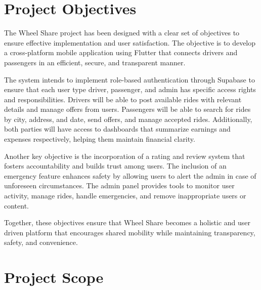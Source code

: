\section{Project Objectives}
The Wheel Share project has been designed with a clear set of objectives to ensure effective implementation and user satisfaction. The objective is to develop a cross-platform mobile application using Flutter that connects drivers and passengers in an efficient, secure, and transparent manner.

The system intends to implement role-based authentication through Supabase to ensure that each user type driver, passenger, and admin has specific access rights and responsibilities. Drivers will be able to post available rides with relevant details and manage offers from users. Passengers will be able to search for rides by city, address, and date, send offers, and manage accepted rides. Additionally, both parties will have access to dashboards that summarize earnings and expenses respectively, helping them maintain financial clarity.

Another key objective is the incorporation of a rating and review system that fosters accountability and builds trust among users. The inclusion of an emergency feature enhances safety by allowing users to alert the admin in case of unforeseen circumstances\cite{gangadharaiah2023}. The admin panel provides tools to monitor user activity, manage rides, handle emergencies, and remove inappropriate users or content.

Together, these objectives ensure that Wheel Share becomes a holistic and user driven platform that encourages shared mobility while maintaining transparency, safety, and convenience.



\section{Project Scope}

